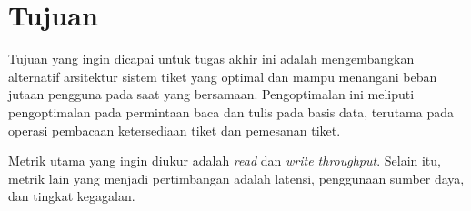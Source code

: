 \section{Tujuan}

Tujuan yang ingin dicapai untuk tugas akhir ini adalah mengembangkan alternatif arsitektur sistem tiket yang optimal dan mampu menangani beban jutaan pengguna pada saat yang bersamaan. Pengoptimalan ini meliputi pengoptimalan pada permintaan baca dan tulis pada basis data, terutama pada operasi pembacaan ketersediaan tiket dan pemesanan tiket.

Metrik utama yang ingin diukur adalah \textit{read} dan \textit{write throughput}. Selain itu, metrik lain yang menjadi pertimbangan adalah latensi, penggunaan sumber daya, dan tingkat kegagalan.
